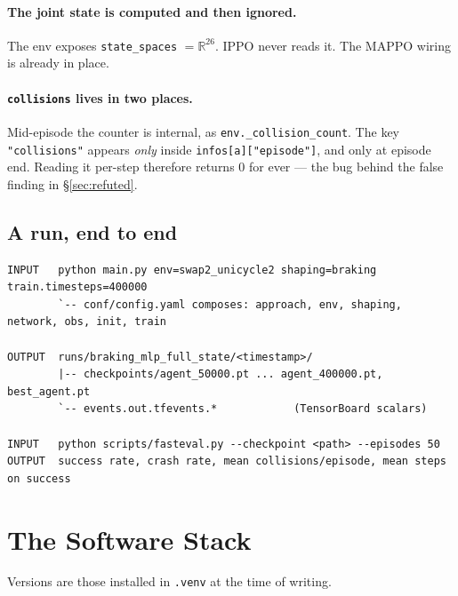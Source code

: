 \documentclass[11pt,a4paper]{article}
\newcommand{\code}[1]{\texttt{\small #1}}
\newcommand{\R}{\mathbb{R}}
\begin{document}
\paragraph{The joint state is computed and then ignored.} The env exposes
\code{state\_spaces} $=\R^{26}$. IPPO never reads it. The MAPPO wiring is already in place.

\paragraph{\code{collisions} lives in two places.} Mid-episode the counter is internal,
as \code{env.\_collision\_count}. The key \code{"collisions"} appears \emph{only} inside
\code{infos[a]["episode"]}, and only at episode end. Reading it per-step therefore returns
$0$ for ever --- the bug behind the false finding in \S\ref{sec:refuted}.

\subsection{A run, end to end}

\begin{lstlisting}
INPUT   python main.py env=swap2_unicycle2 shaping=braking train.timesteps=400000
        `-- conf/config.yaml composes: approach, env, shaping, network, obs, init, train

OUTPUT  runs/braking_mlp_full_state/<timestamp>/
        |-- checkpoints/agent_50000.pt ... agent_400000.pt, best_agent.pt
        `-- events.out.tfevents.*            (TensorBoard scalars)

INPUT   python scripts/fasteval.py --checkpoint <path> --episodes 50
OUTPUT  success rate, crash rate, mean collisions/episode, mean steps on success
\end{lstlisting}

\section{The Software Stack}
\label{app:tools}

Versions are those installed in \code{.venv} at the time of writing.
\end{document}
